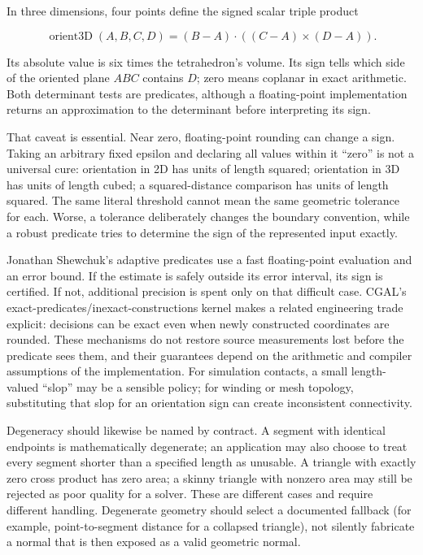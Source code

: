 In three dimensions, four points define the signed scalar triple product

\[
\operatorname{orient3D}(A,B,C,D)=(B-A)\cdot((C-A)\times(D-A)).
\]

Its absolute value is six times the tetrahedron's volume. Its sign tells which side of the oriented plane \(ABC\) contains \(D\); zero means coplanar in exact arithmetic. Both determinant tests are predicates, although a floating-point implementation returns an approximation to the determinant before interpreting its sign.

That caveat is essential. Near zero, floating-point rounding can change a sign. Taking an arbitrary fixed epsilon and declaring all values within it ``zero'' is not a universal cure: orientation in 2D has units of length squared; orientation in 3D has units of length cubed; a squared-distance comparison has units of length squared. The same literal threshold cannot mean the same geometric tolerance for each. Worse, a tolerance deliberately changes the boundary convention, while a robust predicate tries to determine the sign of the represented input exactly.

Jonathan Shewchuk's adaptive predicates use a fast floating-point evaluation and an error bound. If the estimate is safely outside its error interval, its sign is certified. If not, additional precision is spent only on that difficult case. CGAL's exact-predicates/inexact-constructions kernel makes a related engineering trade explicit: decisions can be exact even when newly constructed coordinates are rounded. These mechanisms do not restore source measurements lost before the predicate sees them, and their guarantees depend on the arithmetic and compiler assumptions of the implementation. For simulation contacts, a small length-valued ``slop'' may be a sensible policy; for winding or mesh topology, substituting that slop for an orientation sign can create inconsistent connectivity.

Degeneracy should likewise be named by contract. A segment with identical endpoints is mathematically degenerate; an application may also choose to treat every segment shorter than a specified length as unusable. A triangle with exactly zero cross product has zero area; a skinny triangle with nonzero area may still be rejected as poor quality for a solver. These are different cases and require different handling. Degenerate geometry should select a documented fallback (for example, point-to-segment distance for a collapsed triangle), not silently fabricate a normal that is then exposed as a valid geometric normal.

